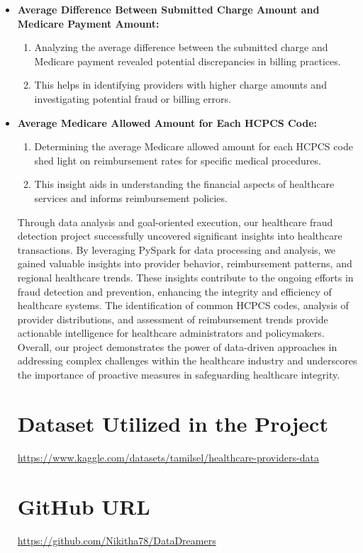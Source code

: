 \documentclass{article}
\begin{document}
\begin{itemize}
\item\textbf{ Average Difference Between Submitted Charge Amount and Medicare Payment Amount:}
\begin{enumerate}
    \item Analyzing the average difference between the submitted charge and Medicare payment revealed potential discrepancies in billing practices.
    \item This helps in identifying providers with higher charge amounts and investigating potential fraud or billing errors.
\end{enumerate}

\item\textbf{ Average Medicare Allowed Amount for Each HCPCS Code:}
\begin{enumerate}
    \item Determining the average Medicare allowed amount for each HCPCS code shed light on reimbursement rates for specific medical procedures.
    \item This insight aids in understanding the financial aspects of healthcare services and informs reimbursement policies.
\end{enumerate}

\hspace{1cm}Through data analysis and goal-oriented execution, our healthcare fraud detection project successfully uncovered significant insights into healthcare transactions. By leveraging PySpark for data processing and analysis, we gained valuable insights into provider behavior, reimbursement patterns, and regional healthcare trends. These insights contribute to the ongoing efforts in fraud detection and prevention, enhancing the integrity and efficiency of healthcare systems. The identification of common HCPCS codes, analysis of provider distributions, and assessment of reimbursement trends provide actionable intelligence for healthcare administrators and policymakers. Overall, our project demonstrates the power of data-driven approaches in addressing complex challenges within the healthcare industry and underscores the importance of proactive measures in safeguarding healthcare integrity.

\section{Dataset Utilized in the Project}
\url{https://www.kaggle.com/datasets/tamilsel/healthcare-providers-data}
\section{GitHub URL}
\url{https://github.com/Nikitha78/DataDreamers}
\end{itemize}
\end{document}
